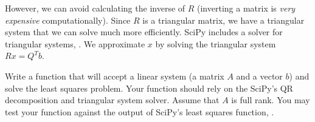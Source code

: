 However, we can avoid calculating the inverse of $R$ (inverting a matrix is \emph{very expensive} computationally).
Since $R$ is a triangular matrix, we have a triangular system that we can solve much more efficiently.
SciPy includes a solver for triangular systems, .
We approximate $x$ by solving the triangular system $Rx = Q^T b$.

\begin{problem}
Write a function  that will accept a linear system (a matrix $A$ and a vector $b$) and solve the least squares problem.
Your function should rely on the SciPy's QR decomposition and triangular system solver.  Assume that $A$ is full rank.
You may test your function against the output of SciPy's least squares function, .
\end{problem}
